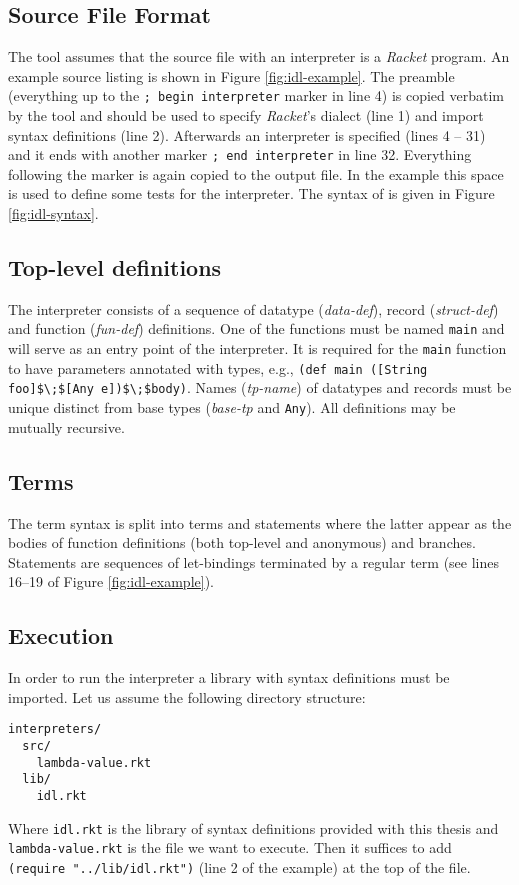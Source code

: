 \subsection*{Source File Format}
The tool assumes that the source file with an interpreter is a \textit{Racket} program.
An example source listing is shown in Figure \ref{fig:idl-example}.
The preamble (everything up to the \lstinline!; begin interpreter! marker in line 4) is copied verbatim by the tool and should be used to specify \emph{Racket}'s dialect (line 1) and import syntax definitions (line 2).
Afterwards an interpreter is specified (lines 4 -- 31) and it ends with another marker \lstinline!; end interpreter! in line 32.
Everything following the marker is again copied to the output file.
In the example this space is used to define some tests for the interpreter.
The syntax of \IDL{} is given in Figure \ref{fig:idl-syntax}.

\subsection*{Top-level definitions}
The interpreter consists of a sequence of datatype (\textit{data-def}), record (\textit{struct-def}) and function (\textit{fun-def}) definitions.
One of the functions must be named \lstinline!main! and will serve as an entry point of the interpreter.
It is required for the \lstinline!main! function to have parameters annotated with types, e.g., \lstinline!(def main ([String foo]$\;$[Any e])$\;$body)!.
Names (\textit{tp-name}) of datatypes and records must be unique distinct from base types (\textit{base-tp} and \lstinline!Any!).
All definitions may be mutually recursive.

\subsection*{Terms}
The term syntax is split into terms and statements where the latter appear as the bodies of function definitions (both top-level and anonymous) and branches.
Statements are sequences of let-bindings terminated by a regular term (see lines 16--19 of Figure \ref{fig:idl-example}).

\subsection*{Execution}
In order to run the interpreter a library with syntax definitions must be imported.
Let us assume the following directory structure:
\begin{lstlisting}
interpreters/
  src/
    lambda-value.rkt
  lib/
    idl.rkt
\end{lstlisting}
Where \lstinline!idl.rkt! is the library of syntax definitions provided with this thesis and \lstinline!lambda-value.rkt! is the file we want to execute.
Then it suffices to add \lstinline!(require "../lib/idl.rkt")! (line 2 of the example) at the top of the file.

